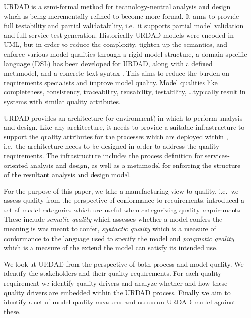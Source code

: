 URDAD is a semi-formal method for technology-neutral analysis and design \cite{solms_urdad_2010} which is being incrementally refined to become more formal. It aims to provide full testability and partial validatability, i.e.\ it supports partial model validation and full service test generation. Historically URDAD models were encoded in UML, but in order to reduce the complexity, tighten up the semantics, and enforce various model qualities through a rigid model structure, a domain specific language (DSL) has been developed for URDAD, along with a defined metamodel, and a concrete text syntax \cite{solmsfritz_domain-specific_????}. This aims to reduce the burden on requirements specialists and improve model quality. Model qualities like completeness, consistency, traceability, reusability, testability, \dots typically result in systems with similar quality attributes\cite{findItIfYouCan}.

URDAD provides an architecture (or environment) in which to perform analysis and design. Like any architecture, it needs to provide a suitable infrastructure to support the quality attributes for the processes which are deployed within \cite{}, i.e.\ the architecture needs to be designed in order to address the quality requirements. The infrastructure includes the process definition for services-oriented analysis and design, as well as a metamodel for enforcing the structure of the resultant analysis and design model.

For the purpose of this paper, we take a manufacturing view \cite{garvin_what_1984} to quality, i.e.\  we assess quality from the perspective of conformance to requirements. \cite{lindland_understanding_1994} introduced a set of model categories which are useful when categorizing quality requirements. These include \emph{sematic quality} which assesses whether a model confers the meaning is was meant to confer, \emph{syntactic quality} which is a measure of conformance to the language used to specify the model and \emph{pragmatic quality} which is a measure of the extend the model can satisfy its intended use.

We look at URDAD from the perspective of both process and model quality. We identify the stakeholders and their quality requirements. For each quality requirement we identify quality drivers and analyze whether and how these quality drivers are embedded within the URDAD process. Finally we aim to identify a set of model quality measures and assess an URDAD model against these.
